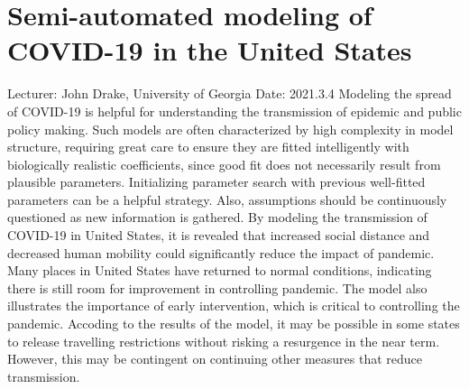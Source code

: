 \documentclass[11pt]{article}
\begin{document}
  \section{Semi-automated modeling of COVID-19 in the United States}
  Lecturer: John Drake, University of Georgia
  \newline
  Date: 2021.3.4
  \newline
  Modeling the spread of COVID-19 is helpful for understanding the transmission of epidemic and public policy making. 
  Such models are often characterized by high complexity in model structure, requiring great care to ensure they are fitted intelligently with biologically realistic coefficients, since good fit does not necessarily result from plausible parameters. 
  Initializing parameter search with previous well-fitted parameters can be a helpful strategy.  
  Also, assumptions should be continuously questioned as new information is gathered.
  \newline
  By modeling the transmission of COVID-19 in United States, it is revealed that increased social distance and decreased human mobility could significantly reduce the impact of pandemic. 
  Many places in United States have returned to normal conditions, indicating there is still room for improvement in controlling pandemic. 
  The model also illustrates the importance of early intervention, which is critical to controlling the pandemic. 
  \newline 
  Accoding to the results of the model, it may be possible in some states to release travelling restrictions without risking a resurgence in the near term. 
  However, this may be contingent on continuing other measures that reduce transmission. 


  \newpage
\end{document}
